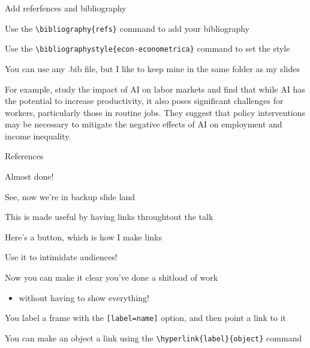 \documentclass[notes,11pt, aspectratio=169]{beamer}
\newenvironment{wideitemize}{\itemize\addtolength{\itemsep}{10pt}}{\enditemize}
\begin{document}
\begin{frame}{Add referfences and bibliography}
  \begin{wideitemize}
    \item Use the \texttt{\textbackslash bibliography\{refs\}} command to add your bibliography
    \item Use the \texttt{\textbackslash bibliographystyle\{econ-econometrica\}} command to set the style
    \item You can use any .bib file, but I like to keep mine in the same folder as my slides
  \end{wideitemize}
  \vspace*{1em}

  For example, \citet{acemoglu2024} study the impact of AI on labor markets and find that while AI has the potential to increase productivity, it also poses significant challenges for workers, particularly those in routine jobs. They suggest that policy interventions may be necessary to mitigate the negative effects of AI on employment and income inequality.
\end{frame}


\begin{frame}{References}


    
\end{frame}
\appendix

\begin{frame}[label=appendix_start]{Almost done!}
  \begin{wideitemize}
  \item See, now we're in backup slide land
  \item This is made useful by having links throughtout the talk
  \item Here's a button, which is how I make links \hyperlink{appendix_end}{}
  \end{wideitemize}
\end{frame}

\begin{frame}[label=appendix_end]{Use it to intimidate audiences!}
  \begin{wideitemize}
    \item[] Now you can make it clear you've done a shitload of work
      \begin{itemize}
      \item[]  without having to show everything! \hyperlink{appendix_start}{}
      \end{itemize}
    \item[] You label a frame with the \texttt{[label=name]} option, and then point a link to it
    \item[] You can make an object a link using the \texttt{\textbackslash hyperlink\{label\}\{object\}} command
  \end{wideitemize}
\end{frame}
\end{document}
